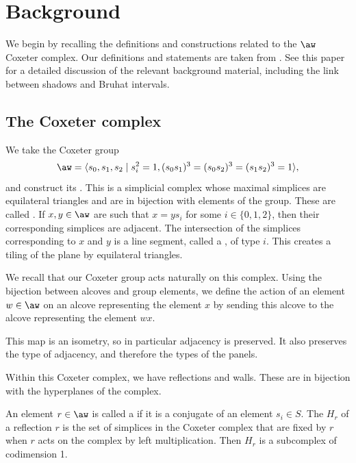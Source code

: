 \documentclass[11pt]{article}
\begin{document}
\section{Background}\label{background}
We begin by recalling the definitions and constructions related to the $\aw$ Coxeter complex. Our definitions and statements are taken from \cite{MASTERS}. See this paper for a detailed discussion of the relevant background material, including the link between shadows and Bruhat intervals. 

\subsection{The Coxeter complex}\label{roots}


We take the Coxeter group 
\[\aw=\langle s_0,s_1,s_2\mid s_i^2=1, (s_0s_1)^3=(s_0s_2)^3=(s_1s_2)^3=1\rangle,\]
and construct its . This is a simplicial complex whose maximal simplices are equilateral triangles and are in bijection with elements of the group. These are called . If $x,y\in \aw$ are such that $x=ys_i$ for some $i\in\{0,1,2\}$, then their corresponding simplices are adjacent. The intersection of the simplices corresponding to $x$ and $y$ is a line segment, called a , of type $i$. This creates a tiling of the plane by equilateral triangles. 

We recall that our Coxeter group acts naturally on this complex. Using the bijection between alcoves and group elements, we define the action of an element $w\in \aw$ on an alcove representing the element $x$ by sending this alcove to the alcove representing the element $wx$. 

\begin{remark}\label{typepreserved}
This map is an isometry, so in particular adjacency is preserved. It also preserves the type of adjacency, and therefore the types of the panels.
\end{remark}

Within this Coxeter complex, we have reflections and walls. These are in bijection with the hyperplanes of the complex. 

\begin{definition}\label{walls}
    An element $r\in \aw$ is called a  if it is a conjugate of an element $s_i\in S$. The  $H_r$ of a reflection $r$ is the set of simplices in the Coxeter complex that are fixed by $r$ when $r$ acts on the complex by left multiplication. Then $H_r$ is a subcomplex of codimension 1.
\end{definition}
\end{document}
